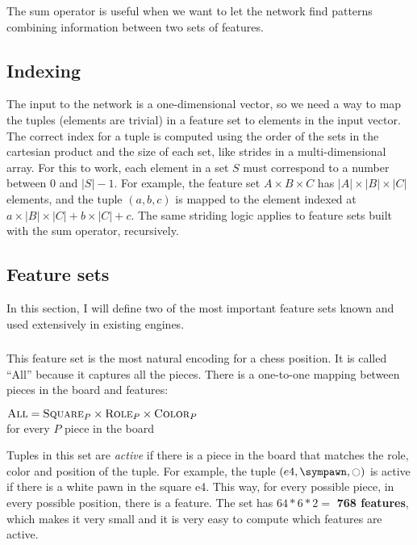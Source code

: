The sum operator is useful when we want to let the network find patterns combining information between two sets of features.

\subsection{Indexing}

The input to the network is a one-dimensional vector, so we need a way to map the tuples (elements are trivial) in a feature set to elements in the input vector. The correct index for a tuple is computed using the order of the sets in the cartesian product and the size of each set, like strides in a multi-dimensional array. For this to work, each element in a set $S$ must correspond to a number between $0$ and $|S| - 1$. For example, the feature set $A \times B \times C$ has $|A| \times |B| \times |C|$ elements, and the tuple $(a, b, c)$ is mapped to the element indexed at $a \times |B| \times |C| + b \times |C| + c$. The same striding logic applies to feature sets built with the sum operator, recursively.

\subsection{Feature sets}

In this section, I will define two of the most important feature sets known and used extensively in existing engines.

\subsubsection{\mdseries{}}

This feature set is the most natural encoding for a chess position. It is called \enquote{All} because it captures all the pieces. There is a one-to-one mapping between pieces in the board and features:

\begin{center}
    $\textsc{All} = \textsc{Square}_{P} \times \textsc{Role}_{P} \times \textsc{Color}_{P}$ \\
    for every $P$ piece in the board \\
\end{center}

Tuples in this set are \textit{active} if there is a piece in the board that matches the role, color and position of the tuple. For example, the tuple $(e4, \sympawn, \white)$ is active if there is a white pawn in the square e4. This way, for every possible piece, in every possible position, there is a feature. The set has $64*6*2=$\textbf{ 768 features}, which makes it very small and it is very easy to compute which features are active.

